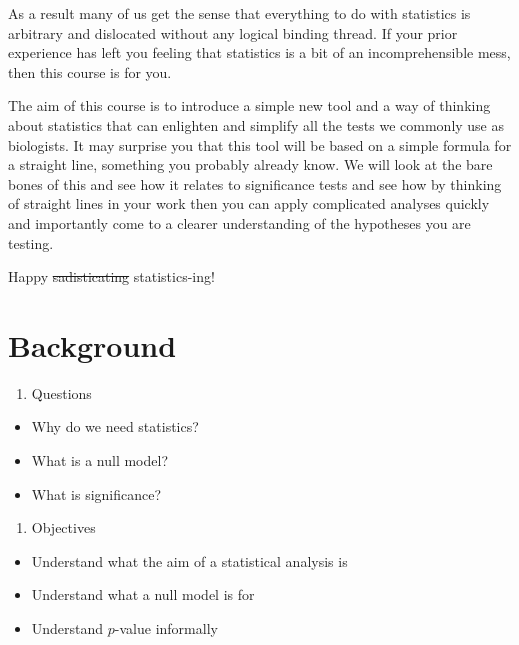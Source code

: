 \documentclass[
]{book}
\providecommand{\tightlist}{%
  \setlength{\itemsep}{0pt}\setlength{\parskip}{0pt}}
\begin{document}
As a result many of us get the sense that everything to do with statistics is arbitrary and dislocated without any logical binding thread. If your prior experience has left you feeling that statistics is a bit of an incomprehensible mess, then this course is for you.

The aim of this course is to introduce a simple new tool and a way of thinking about statistics that can enlighten and simplify all the tests we commonly use as biologists. It may surprise you that this tool will be based on a simple formula for a straight line, something you probably already know. We will look at the bare bones of this and see how it relates to significance tests and see how by thinking of straight lines in your work then you can apply complicated analyses quickly and importantly come to a clearer understanding of the hypotheses you are testing.

Happy \sout{sadisticating} statistics-ing!

\hypertarget{background}{%
\chapter{Background}\label{background}}

\begin{enumerate}
\def\labelenumi{\arabic{enumi}.}
\tightlist
\item
  Questions
\end{enumerate}

\begin{itemize}
\tightlist
\item
  Why do we need statistics?
\item
  What is a null model?
\item
  What is significance?
\end{itemize}

\begin{enumerate}
\def\labelenumi{\arabic{enumi}.}
\setcounter{enumi}{1}
\tightlist
\item
  Objectives
\end{enumerate}

\begin{itemize}
\tightlist
\item
  Understand what the aim of a statistical analysis is
\item
  Understand what a null model is for
\item
  Understand \(p\)-value informally
\end{itemize}
\end{document}
